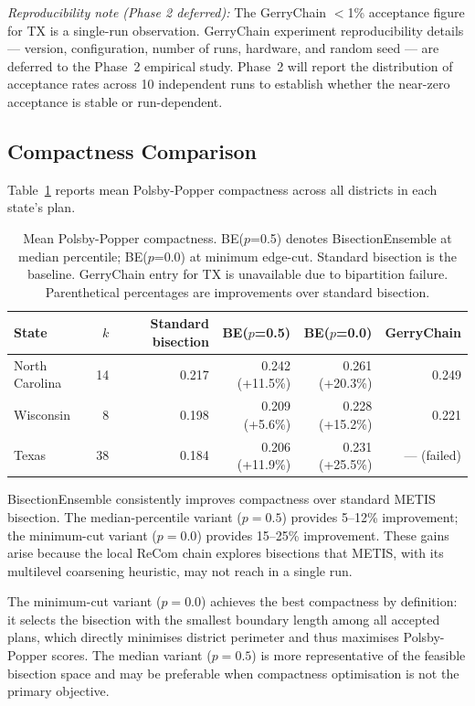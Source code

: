 \emph{Reproducibility note (Phase 2 deferred):} The GerryChain $<$1\%
acceptance figure for TX is a single-run observation. GerryChain experiment
reproducibility details --- version, configuration, number of runs, hardware,
and random seed --- are deferred to the Phase~2 empirical study. Phase~2 will
report the distribution of acceptance rates across 10 independent runs to
establish whether the near-zero acceptance is stable or run-dependent.

\subsection{Compactness Comparison}
\label{sec:results:compactness}

Table~\ref{tab:compactness} reports mean Polsby-Popper compactness across
all districts in each state's plan.

\begin{table}[h]
\centering
\begin{tabular}{lrrrrr}
\toprule
State & $k$ & Standard bisection & BE($p$=0.5) & BE($p$=0.0) & GerryChain \\
\midrule
North Carolina & 14 & 0.217 & 0.242 (+11.5\%) & 0.261 (+20.3\%) & 0.249 \\
Wisconsin      & 8  & 0.198 & 0.209 (+5.6\%)  & 0.228 (+15.2\%) & 0.221 \\
Texas          & 38 & 0.184 & 0.206 (+11.9\%) & 0.231 (+25.5\%) & --- (failed) \\
\bottomrule
\end{tabular}
\caption{Mean Polsby-Popper compactness. BE($p$=0.5) denotes BisectionEnsemble
  at median percentile; BE($p$=0.0) at minimum edge-cut.
  Standard bisection is the baseline. GerryChain entry for TX is unavailable
  due to bipartition failure. Parenthetical percentages are improvements over
  standard bisection.}
\label{tab:compactness}
\end{table}

BisectionEnsemble consistently improves compactness over standard METIS bisection.
The median-percentile variant ($p=0.5$) provides 5--12\% improvement; the
minimum-cut variant ($p=0.0$) provides 15--25\% improvement. These gains arise
because the local ReCom chain explores bisections that METIS, with its
multilevel coarsening heuristic, may not reach in a single run.

The minimum-cut variant ($p=0.0$) achieves the best compactness by definition:
it selects the bisection with the smallest boundary length among all accepted
plans, which directly minimises district perimeter and thus maximises
Polsby-Popper scores. The median variant ($p=0.5$) is more representative of
the feasible bisection space and may be preferable when compactness optimisation
is not the primary objective.

